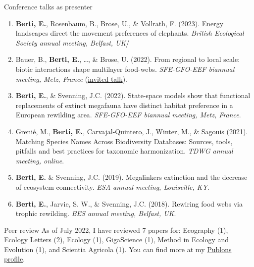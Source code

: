 \documentclass{resume} %
\begin{document}
\begin{rSection}{Conference talks as presenter}
\begin{enumerate}
    \setlength\itemsep{-0.5em}
    \item \textbf{Berti, E.}, Rosenbaum, B., Brose, U., \& Vollrath, F. (2023). Energy landscapes direct the movement preferences of elephants. \textit{British Ecological Society annual meeting, Belfast, UK}/
    \item Bauer, B., \textbf{Berti, E.}, \dots, \& Brose, U. (2022). From regional to local scale: biotic interactions shape multilayer food-webs. \textit{SFE-GFO-EEF biannual meeting, Metz, France} (\underline{invited talk}).
    \item \textbf{Berti, E.}, \& Svenning, J.C. (2022). State-space models show that functional replacements of extinct megafauna have distinct habitat preference in a European rewilding area. \textit{SFE-GFO-EEF biannual meeting, Metz, France}.
    \item Grenié, M., \textbf{Berti, E.}, Carvajal-Quintero, J., Winter, M., \& Sagouis (2021). Matching Species Names Across Biodiversity Databases: Sources, tools, pitfalls and best practices for taxonomic harmonization. \textit{TDWG annual meeting, online}.
    \item \textbf{Berti, E.} \& Svenning, J.C. (2019). Megalinkers extinction and the decrease of ecosystem connectivity. \textit{ESA annual meeting, Louisville, KY}.
    \item \textbf{Berti, E.}, Jarvie, S. W., \& Svenning, J.C. (2018). Rewiring food webs via trophic rewilding. \textit{BES annual meeting, Belfast, UK}.
\end{enumerate}
\end{rSection}

\begin{rSection}{Peer review}
As of July 2022, I have reviewed 7 papers for: Ecography (1), Ecology Letters (2), Ecology (1), GigaScience (1), Method in Ecology and Evolution (1), and Scientia Agricola (1). You can find more at my \href{https://publons.com/wos-op/researcher/4208953/emilio-berti/}{Publons profile}.
\end{rSection}
\end{document}
